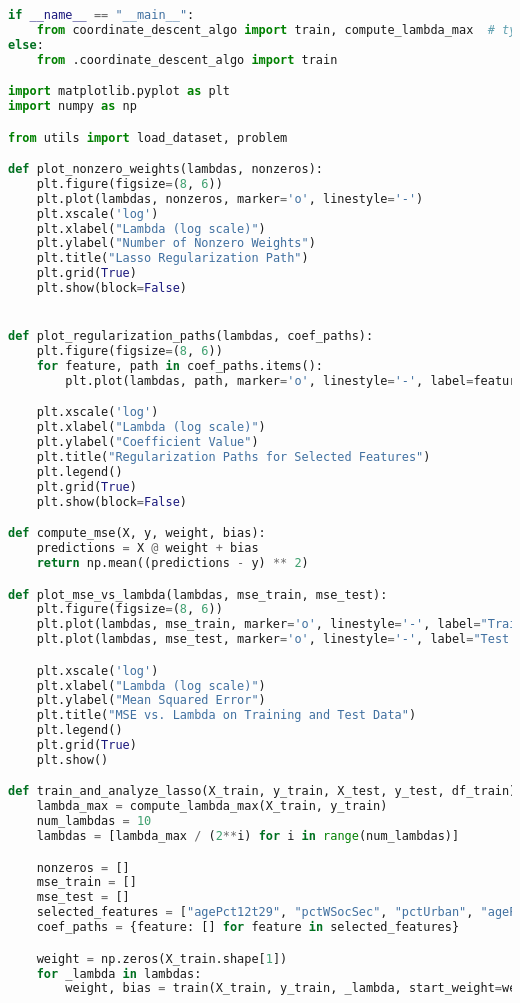 \documentclass{article}
\begin{document}
\begin{lstlisting}[language=Python]
if __name__ == "__main__":
    from coordinate_descent_algo import train, compute_lambda_max  # type: ignore
else:
    from .coordinate_descent_algo import train

import matplotlib.pyplot as plt
import numpy as np

from utils import load_dataset, problem

def plot_nonzero_weights(lambdas, nonzeros):
    plt.figure(figsize=(8, 6))
    plt.plot(lambdas, nonzeros, marker='o', linestyle='-')
    plt.xscale('log')
    plt.xlabel("Lambda (log scale)")
    plt.ylabel("Number of Nonzero Weights")
    plt.title("Lasso Regularization Path")
    plt.grid(True)
    plt.show(block=False)


def plot_regularization_paths(lambdas, coef_paths):
    plt.figure(figsize=(8, 6))
    for feature, path in coef_paths.items():
        plt.plot(lambdas, path, marker='o', linestyle='-', label=feature)

    plt.xscale('log')
    plt.xlabel("Lambda (log scale)")
    plt.ylabel("Coefficient Value")
    plt.title("Regularization Paths for Selected Features")
    plt.legend()
    plt.grid(True)
    plt.show(block=False)

def compute_mse(X, y, weight, bias):
    predictions = X @ weight + bias
    return np.mean((predictions - y) ** 2)

def plot_mse_vs_lambda(lambdas, mse_train, mse_test):
    plt.figure(figsize=(8, 6))
    plt.plot(lambdas, mse_train, marker='o', linestyle='-', label="Train MSE")
    plt.plot(lambdas, mse_test, marker='o', linestyle='-', label="Test MSE")

    plt.xscale('log')
    plt.xlabel("Lambda (log scale)")
    plt.ylabel("Mean Squared Error")
    plt.title("MSE vs. Lambda on Training and Test Data")
    plt.legend()
    plt.grid(True)
    plt.show()

def train_and_analyze_lasso(X_train, y_train, X_test, y_test, df_train):
    lambda_max = compute_lambda_max(X_train, y_train)
    num_lambdas = 10
    lambdas = [lambda_max / (2**i) for i in range(num_lambdas)]

    nonzeros = []
    mse_train = []
    mse_test = []
    selected_features = ["agePct12t29", "pctWSocSec", "pctUrban", "agePct65up", "householdsize"]
    coef_paths = {feature: [] for feature in selected_features}

    weight = np.zeros(X_train.shape[1])
    for _lambda in lambdas:
        weight, bias = train(X_train, y_train, _lambda, start_weight=weight)


\end{lstlisting}
\end{document}
